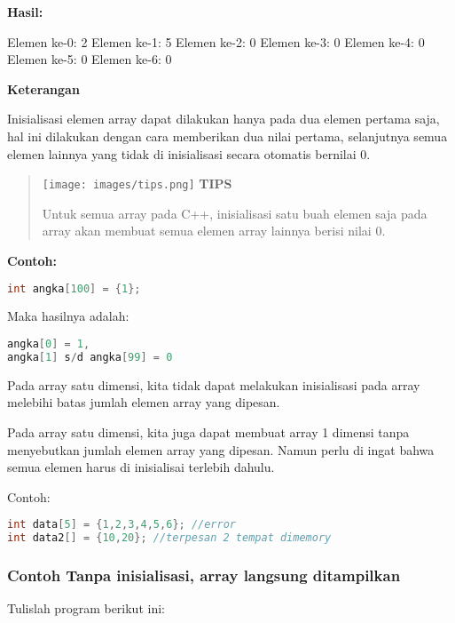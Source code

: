 \textbf{Hasil:}

\begin{lcverbatim}
	Elemen ke-0: 2
	Elemen ke-1: 5
	Elemen ke-2: 0
	Elemen ke-3: 0
	Elemen ke-4: 0
	Elemen ke-5: 0
	Elemen ke-6: 0
\end{lcverbatim}

\textbf{Keterangan}

Inisialisasi elemen array dapat dilakukan hanya pada dua elemen pertama
saja, hal ini dilakukan dengan cara memberikan dua nilai pertama,
selanjutnya semua elemen lainnya yang tidak di inisialisasi secara
otomatis bernilai 0.

\begin{quotation}
\texttt{[image: images/tips.png]}	\textbf{TIPS}
	
	Untuk
	semua array pada C++, inisialisasi satu buah elemen saja pada array akan
	membuat semua elemen array lainnya berisi nilai 0.
\end{quotation}
 

\textbf{Contoh:}

\begin{lstlisting}[language=c++, numbers=none]
int angka[100] = {1};
\end{lstlisting}

Maka hasilnya adalah:

\begin{lstlisting}[language=c++, numbers=none]
angka[0] = 1,
angka[1] s/d angka[99] = 0
\end{lstlisting}

Pada array satu dimensi, kita tidak dapat melakukan inisialisasi pada
array melebihi batas jumlah elemen array yang dipesan.

Pada array satu dimensi, kita juga dapat membuat array 1 dimensi tanpa
menyebutkan jumlah elemen array yang dipesan. Namun perlu di ingat bahwa
semua elemen harus di inisialisai terlebih dahulu.

Contoh:

\begin{lstlisting}[language=c++, numbers=none]
int data[5] = {1,2,3,4,5,6}; //error
int data2[] = {10,20}; //terpesan 2 tempat dimemory
\end{lstlisting}

\subsubsection*{Contoh  Tanpa inisialisasi, array langsung ditampilkan}

Tulislah program berikut ini:

